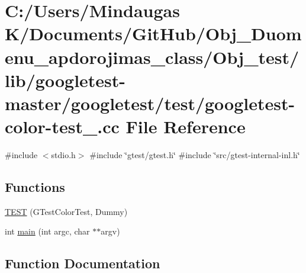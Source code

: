 \hypertarget{_obj__test_2lib_2googletest-master_2googletest_2test_2googletest-color-test___8cc}{}\section{C\+:/\+Users/\+Mindaugas K/\+Documents/\+Git\+Hub/\+Obj\+\_\+\+Duomenu\+\_\+apdorojimas\+\_\+class/\+Obj\+\_\+test/lib/googletest-\/master/googletest/test/googletest-\/color-\/test\+\_\+.cc File Reference}
\label{_obj__test_2lib_2googletest-master_2googletest_2test_2googletest-color-test___8cc}
{\ttfamily \#include $<$stdio.\+h$>$}\newline
{\ttfamily \#include \char`\"{}gtest/gtest.\+h\char`\"{}}\newline
{\ttfamily \#include \char`\"{}src/gtest-\/internal-\/inl.\+h\char`\"{}}\newline
\subsection*{Functions}
\begin{DoxyCompactItemize}
\item 
\mbox{\hyperlink{_obj__test_2lib_2googletest-master_2googletest_2test_2googletest-color-test___8cc_a78903f80b07f944e7aa466ebdff1d644}{T\+E\+ST}} (G\+Test\+Color\+Test, Dummy)
\item 
int \mbox{\hyperlink{_obj__test_2lib_2googletest-master_2googletest_2test_2googletest-color-test___8cc_a3c04138a5bfe5d72780bb7e82a18e627}{main}} (int argc, char $\ast$$\ast$argv)
\end{DoxyCompactItemize}


\subsection{Function Documentation}
\mbox{\label{_obj__test_2lib_2googletest-master_2googletest_2test_2googletest-color-test___8cc_a3c04138a5bfe5d72780bb7e82a18e627}} 
